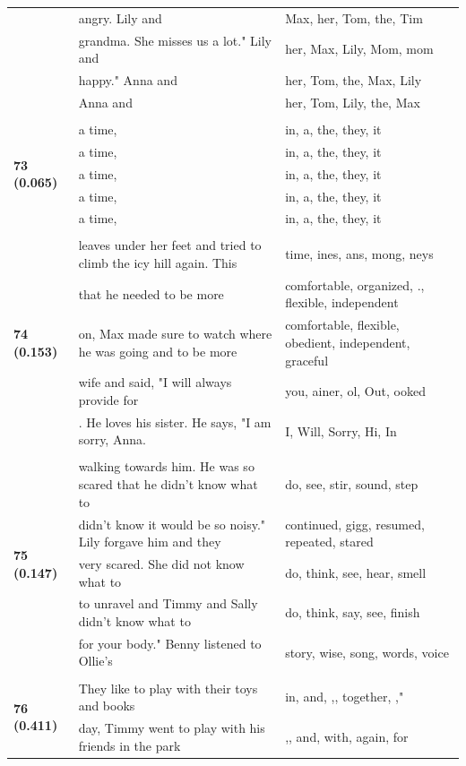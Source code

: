 \documentclass{article}
\theoremstyle{plain}
\theoremstyle{definition}
\theoremstyle{remark}
\begin{document}
\begin{longtable}{|p{}|p{}|p{}|}
& angry.  Lily and & Max,  her,  Tom,  the,  Tim \\
& grandma. She misses us a lot."  Lily and & her,  Max,  Lily,  Mom,  mom \\
& happy."  Anna and & her,  Tom,  the,  Max,  Lily \\
& Anna and & her,  Tom,  Lily,  the,  Max \\
& & \\
\multirow{5}{*}{\textbf{73 (0.065)}} & a time, & in,  a,  the,  they,  it \\
& a time, & in,  a,  the,  they,  it \\
& a time, & in,  a,  the,  they,  it \\
& a time, & in,  a,  the,  they,  it \\
& a time, & in,  a,  the,  they,  it \\
& & \\
\multirow{5}{*}{\textbf{74 (0.153)}} & leaves under her feet and tried to climb the icy hill again.  This & time, ines, ans, mong, neys \\
& that he needed to be more & comfortable,  organized, .,  flexible,  independent \\
& on, Max made sure to watch where he was going and to be more & comfortable,  flexible,  obedient,  independent,  graceful \\
& wife and said, "I will always provide for & you, ainer, ol, Out, ooked \\
& . He loves his sister. He says, "I am sorry, Anna. & I,  Will,  Sorry,  Hi,  In \\
& & \\
\multirow{5}{*}{\textbf{75 (0.147)}} & walking towards him. He was so scared that he didn't know what to & do,  see,  stir,  sound,  step \\
& didn't know it would be so noisy." Lily forgave him and they & continued,  gigg,  resumed,  repeated,  stared \\
& very scared. She did not know what to & do,  think,  see,  hear,  smell \\
& to unravel and Timmy and Sally didn't know what to & do,  think,  say,  see,  finish \\
& for your body."  Benny listened to Ollie's & story,  wise,  song,  words,  voice \\
& & \\
\multirow{5}{*}{\textbf{76 (0.411)}} & They like to play with their toys and books & in,  and, ,,  together, ," \\
& day, Timmy went to play with his friends in the park & ,,  and,  with,  again,  for \\

\end{longtable}
\end{document}
